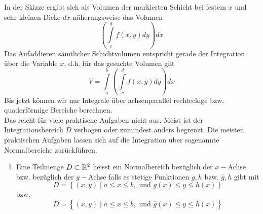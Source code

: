 In der Skizze ergibt sich als Volumen der markierten Schicht bei festem $x$ und sehr kleinen Dicke $dx$ näherungsweise das Volumen \[\left( {\int\limits_c^d {f\left( {x,y} \right)dy} } \right)dx\] Das Aufaddieren sämtlicher Schichtvolumen entspricht gerade der Integration über die Variable $x$, d.h. für das gesuchte Volumen gilt \[V = \int\limits_a^b {\left( {\int\limits_c^d {f\left( {x,y} \right)dy} } \right)dx} \]
Bis jetzt können wir nur Integrale über achsenparallel rechteckige bzw. quaderförmige Bereiche berechnen.\\

Das reicht für viele praktische Aufgaben nicht aus. Meist ist der Integrationsbereich $D$ verbogen oder zumindest anders begrenzt.
Die meisten praktischen Aufgaben lassen sich auf die Integration über sogenannte Normalbereiche zurückführen.

\begin{definition}{9.10}
\begin{enumerate}
\item Eine Teilmenge $D\subset\mathbb{R}^2$ heisst ein Normalbereich bezüglich der $x-$Achse bzw. bezüglich der $y-$Achse falls es stetige Funktionen $g,h$ bzw. $\overline{g},\overline{h}$ gibt mit
\[D=\left\{ \left( x,y\right)\mid a\leq x\leq b,\text{ und }g(x)\leq y\leq h(x)\right\}\]
bzw.
\[D=\left\{ \left( x,y\right)\mid \overline{a}\leq x\leq \overline{b},\text{ und }\overline{g}(x)\leq y\leq \overline{h}(x)\right\}\]
\end{enumerate}
\end{definition}

